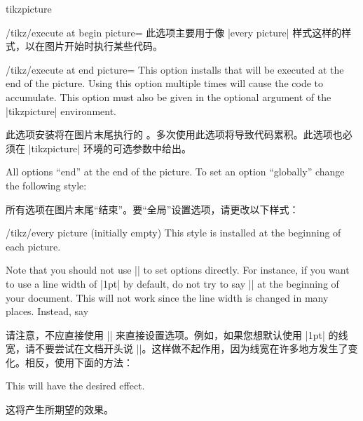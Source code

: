 \begin{environment}{{tikzpicture}}
\begin{key}{/tikz/execute at begin picture=}
      此选项主要用于像 |every picture| 样式这样的样式，以在图片开始时执行某些代码。


  \end{key}

  \begin{key}{/tikz/execute at end picture=}
      This option installs  that will be executed at the end of
      the picture. Using this option multiple times will cause the code to
      accumulate. This option must also be given in the optional argument of
      the |{tikzpicture}| environment.

      此选项安装将在图片末尾执行的 。多次使用此选项将导致代码累积。此选项也必须在 |{tikzpicture}| 环境的可选参数中给出。%


\begin{codeexample}[preamble={\usetikzlibrary{backgrounds}}]
\end{codeexample}
  \end{key}

  All options ``end'' at the end of the picture. To set an option
  ``globally'' change the following style:

  所有选项在图片末尾“结束”。要“全局”设置选项，请更改以下样式：

  \begin{stylekey}{/tikz/every picture (initially \normalfont empty)}
      This style is installed at the beginning of each picture.
\begin{codeexample}
\tikzset{every picture/.style=semithick}
\end{codeexample}
  \end{stylekey}

  Note that you should not use |\tikzset| to set options directly. For
  instance, if you want to use a line width of |1pt| by default, do not try
  to say |\tikzset{line width=1pt}| at the beginning of your document. This
  will not work since the line width is changed in many places. Instead, say

  请注意，不应直接使用 |\tikzset| 来直接设置选项。例如，如果您想默认使用 |1pt| 的线宽，请不要尝试在文档开头说 |\tikzset{line width=1pt}|。这样做不起作用，因为线宽在许多地方发生了变化。相反，使用下面的方法：


\begin{codeexample}
\end{codeexample}
  This will have the desired effect.

  这将产生所期望的效果。

\end{environment}

